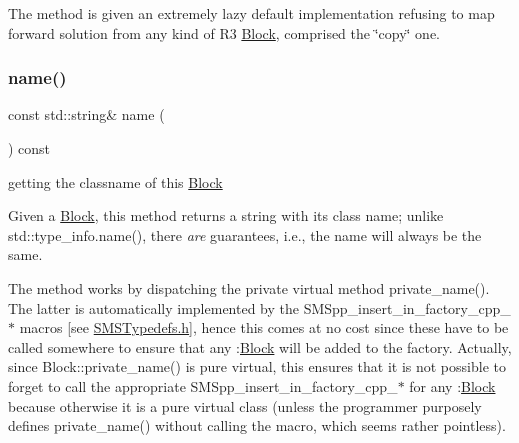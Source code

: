 The method is given an extremely lazy default implementation refusing to map forward solution from any kind of R3 \mbox{\hyperlink{class_s_m_spp__di__unipi__it_1_1_block}{Block}}, comprised the \char`\"{}copy\char`\"{} one. \mbox{\label{class_s_m_spp__di__unipi__it_1_1_block_a738e9dfd6e00507da219e4bd5a3f6be9}} 
\subsubsection{\texorpdfstring{name()}{name()}}
{\footnotesize\ttfamily const std\+::string\& name (\begin{DoxyParamCaption}\item[{void}]{ }\end{DoxyParamCaption}) const\hspace{0.3cm}{\ttfamily [inline]}}



getting the classname of this \mbox{\hyperlink{class_s_m_spp__di__unipi__it_1_1_block}{Block}} 

Given a \mbox{\hyperlink{class_s_m_spp__di__unipi__it_1_1_block}{Block}}, this method returns a string with its class name; unlike std\+::type\+\_\+info.\+name(), there {\itshape are} guarantees, i.\+e., the name will always be the same.

The method works by dispatching the private virtual method private\+\_\+name(). The latter is automatically implemented by the S\+M\+Spp\+\_\+insert\+\_\+in\+\_\+factory\+\_\+cpp\+\_\+$\ast$ macros \mbox{[}see \mbox{\hyperlink{_s_m_s_typedefs_8h}{S\+M\+S\+Typedefs.\+h}}\mbox{]}, hence this comes at no cost since these have to be called somewhere to ensure that any \+:\mbox{\hyperlink{class_s_m_spp__di__unipi__it_1_1_block}{Block}} will be added to the factory. Actually, since Block\+::private\+\_\+name() is pure virtual, this ensures that it is not possible to forget to call the appropriate S\+M\+Spp\+\_\+insert\+\_\+in\+\_\+factory\+\_\+cpp\+\_\+$\ast$ for any \+:\mbox{\hyperlink{class_s_m_spp__di__unipi__it_1_1_block}{Block}} because otherwise it is a pure virtual class (unless the programmer purposely defines private\+\_\+name() without calling the macro, which seems rather pointless). \mbox{\label{class_s_m_spp__di__unipi__it_1_1_block_ae8c20577eae73143d71b37b1550c1e93}} 
